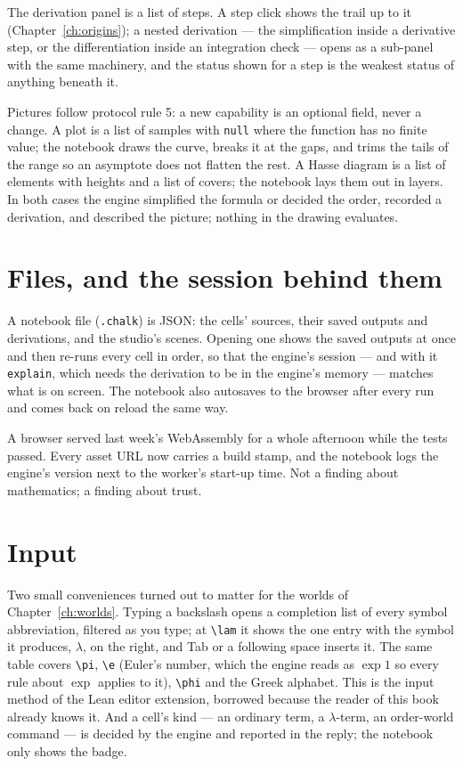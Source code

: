 The derivation panel is a list of steps. A step click shows the trail up to it
(Chapter~\ref{ch:origins}); a nested derivation --- the simplification inside a derivative step,
or the differentiation inside an integration check --- opens as a sub-panel with the same
machinery, and the status shown for a step is the weakest status of anything beneath it.

Pictures follow protocol rule 5: a new capability is an optional field, never a change. A plot is
a list of samples with \texttt{null} where the function has no finite value; the notebook draws the
curve, breaks it at the gaps, and trims the tails of the range so an asymptote does not flatten
the rest. A Hasse diagram is a list of elements with heights and a list of covers; the notebook
lays them out in layers. In both cases the engine simplified the formula or decided the order,
recorded a derivation, and described the picture; nothing in the drawing evaluates.

\section{Files, and the session behind them}

A notebook file (\texttt{.chalk}) is JSON: the cells' sources, their saved outputs and derivations, and the studio's
scenes. Opening one shows the saved outputs at once and then re-runs every cell in order, so that
the engine's session --- and with it \texttt{explain}, which needs the derivation to be in the
engine's memory --- matches what is on screen. The notebook also autosaves to the browser after
every run and comes back on reload the same way.

\begin{logbox}
  A browser served last week's WebAssembly for a whole afternoon while the tests passed. Every
  asset URL now carries a build stamp, and the notebook logs the engine's version next to the
  worker's start-up time. Not a finding about mathematics; a finding about trust.
\end{logbox}

\section{Input}

Two small conveniences turned out to matter for the worlds of Chapter~\ref{ch:worlds}. Typing a
backslash opens a completion list of every symbol abbreviation, filtered as you type; at
\texttt{\textbackslash lam} it shows the one entry with the symbol it produces, $\lambda$, on the
right, and Tab or a following space inserts it. The same table covers \texttt{\textbackslash pi},
\texttt{\textbackslash e} (Euler's number, which the engine reads as $\exp 1$ so every rule about
$\exp$ applies to it), \texttt{\textbackslash phi} and the Greek alphabet. This is the input method of the Lean editor
extension, borrowed because the reader of this book already knows it. And a cell's kind --- an
ordinary term, a $\lambda$-term, an order-world command --- is decided by the engine and reported
in the reply; the notebook only shows the badge.

